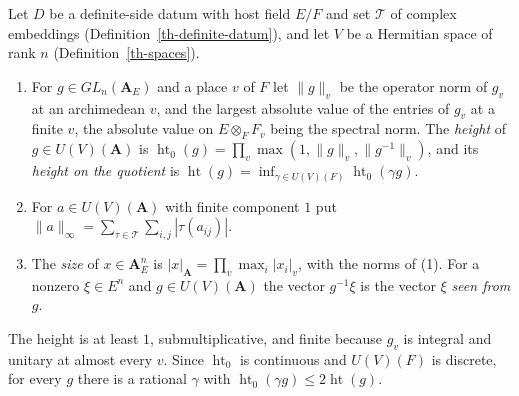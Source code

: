 \begin{definition}\label{th-heights}
Let $D$ be a definite-side datum with host field $E/F$ and set $\mathcal T$ of
complex embeddings (Definition~\ref{th-definite-datum}), and let $V$ be a
Hermitian space of rank $n$ (Definition~\ref{th-spaces}).
\begin{enumerate}
\item For $g\in GL_n(\mathbf A_E)$ and a place $v$ of $F$ let $\|g\|_v$ be the
  operator norm of $g_v$ at an archimedean $v$, and the largest absolute value
  of the entries of $g_v$ at a finite $v$, the absolute value on
  $E\otimes_FF_v$ being the spectral norm. The \emph{height} of
  $g\in U(V)(\mathbf A)$ is
  $\operatorname{ht}_0(g)=\prod_v\max(1,\|g\|_v,\|g^{-1}\|_v)$, and its
  \emph{height on the quotient} is
  $\operatorname{ht}(g)=\inf_{\gamma\in U(V)(F)}\operatorname{ht}_0(\gamma g)$.
\item For $a\in U(V)(\mathbf A)$ with finite component $1$ put
  $\|a\|_\infty=\sum_{\tau\in\mathcal T}\sum_{i,j}|\tau(a_{ij})|$.
\item The \emph{size} of $x\in\mathbf A_E^n$ is
  $|x|_{\mathbf A}=\prod_v\max_i|x_i|_v$, with the norms of (1). For a nonzero
  $\xi\in E^n$ and $g\in U(V)(\mathbf A)$ the vector $g^{-1}\xi$ is the vector
  $\xi$ \emph{seen from} $g$.
\end{enumerate}
\end{definition}

The height is at least $1$, submultiplicative, and finite because $g_v$ is
integral and unitary at almost every $v$. Since $\operatorname{ht}_0$ is
continuous and $U(V)(F)$ is discrete, for every $g$ there is a rational
$\gamma$ with $\operatorname{ht}_0(\gamma g)\leq2\operatorname{ht}(g)$.

